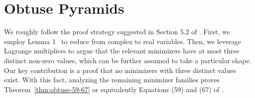\documentclass[11pt]{article}
\begin{document}
\section{Obtuse Pyramids}\label{sec:obtuse}
We roughly follow the proof strategy suggested in Section 5.2 of \citep{holevo2025quantum}. First, we employ Lemma 1~\citep{holevo2025quantum} to reduce from complex to real variables. Then, we leverage Lagrange multipliers to argue that the relevant minimizers have at most three distinct non-zero values, which can be further assumed to take a particular shape. Our key contribution is a proof that no minimizers with three distinct values exist. With this fact, analyzing the remaining minimizer families proves Theorem~\ref{thm:obtuse-59-67} or equivalently Equations (59) and (67) of \citep{holevo2025quantum}.
\end{document}
